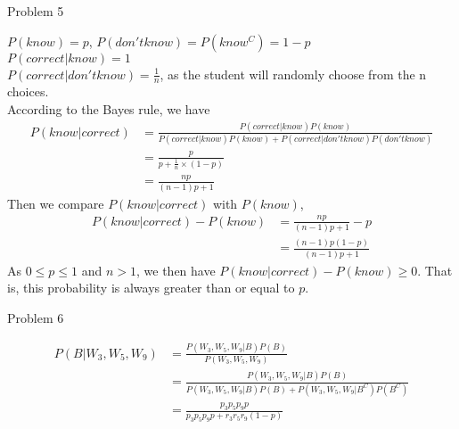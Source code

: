 \documentclass[12pt,letterpaper, onecolumn]{exam}
\begin{document}
\begin{questions}
\begin{solution}
    \end{solution}

    \question Problem 5
    \begin{solution}
        $P(know) = p$, $P(don't know) = P(know^C) = 1-p$ \\
        $P(correct | know) = 1$ \\
        $P(correct | don't know) = \frac{1}{n}$, as the student will randomly choose from the n choices. \\
        According to the Bayes rule, we have
        \begin{align*}
            P(know|correct) & = \frac{P(correct|know)P(know)}{P(correct|know)P(know) + P(correct|don't know)P(don't know)} \\
            & = \frac{p}{p+\frac{1}{n} \times (1-p)} \\
            & = \frac{np}{(n-1)p+1}
        \end{align*}
        Then we compare $P(know|correct)$ with $P(know)$,
        \begin{align*}
            P(know|correct) - P(know) & =  \frac{np}{(n-1)p+1} - p \\
            & = \frac{(n-1)p(1-p)}{(n-1)p+1}
        \end{align*}
        As $0 \leq p \leq1$ and $n>1$, we then have $P(know|correct) - P(know) \geq 0$. That is, this probability is always greater than or equal to $p$.
        
    \end{solution}

    \question Problem 6
    \begin{solution}
        \begin{align*}
            P(B|W_3, W_5, W_9) & = \frac{P(W_3, W_5, W_9|B)P(B)}{P(W_3, W_5, W_9)} \\
            & = \frac{P(W_3, W_5, W_9|B)P(B)}{P(W_3, W_5, W_9|B)P(B) + P(W_3, W_5, W_9|B^C)P(B^C)} \\
            & = \frac{p_3p_5p_9p}{p_3p_5p_9p + r_3r_5r_9(1-p)}
        \end{align*}
    \end{solution}
\end{questions}
\end{document}
